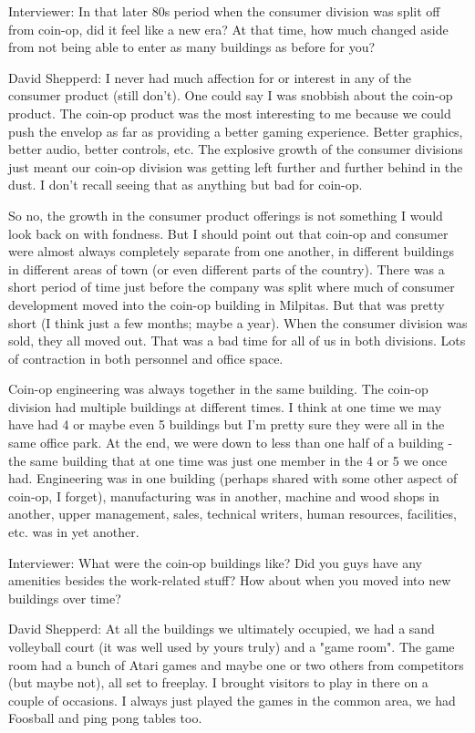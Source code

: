\textcolor{interviewer}{Interviewer:} In that later 80s period when the consumer division was split off from coin-op, did it feel like a new era? At that time, how much changed aside from not being able to enter as many buildings as before for you?

\textcolor{interviewee}{David Shepperd:} I never had much affection for or interest in any of the consumer product (still don't). One could say I was snobbish about the coin-op product. The coin-op product was the most interesting to me because we could push the envelop as far as providing a better gaming experience. Better graphics, better audio, better controls, etc. The explosive growth of the consumer divisions just meant our coin-op division was getting left further and further behind in the dust. I don't recall seeing that as anything but bad for coin-op. 

So no, the growth in the consumer product offerings is not something I would look back on with fondness. But I should point out that coin-op and consumer were almost always completely separate from one another, in different buildings in different areas of town (or even different parts of the country). There was a short period of time just before the company was split where much of consumer development moved into the coin-op building in Milpitas. But that was pretty short (I think just a few months; maybe a year). When the consumer division was sold, they all moved out. That was a bad time for all of us in both divisions. Lots of contraction in both personnel and office space.

Coin-op engineering was always together in the same building. The coin-op division had multiple buildings at different times. I think at one time we may have had 4 or maybe even 5 buildings but I'm pretty sure they were all in the same office park. At the end, we were down to less than one half of a building - the same building that at one time was just one member in the 4 or 5 we once had. Engineering was in one building (perhaps shared with some other aspect of coin-op, I forget), manufacturing was in another, machine and wood shops in another, upper management, sales, technical writers, human resources, facilities, etc. was in yet another.

\textcolor{interviewer}{Interviewer:} What were the coin-op buildings like? Did you guys have any amenities besides the work-related stuff? How about when you moved into new buildings over time?

\textcolor{interviewee}{David Shepperd:} At all the buildings we ultimately occupied, we had a sand volleyball court (it was well used by yours truly) and a "game room". The game room had a bunch of Atari games and maybe one or two others from competitors (but maybe not), all set to freeplay. I brought visitors to play in there on a couple of occasions. I always just played the games in the common area, we had Foosball and ping pong tables too. 


